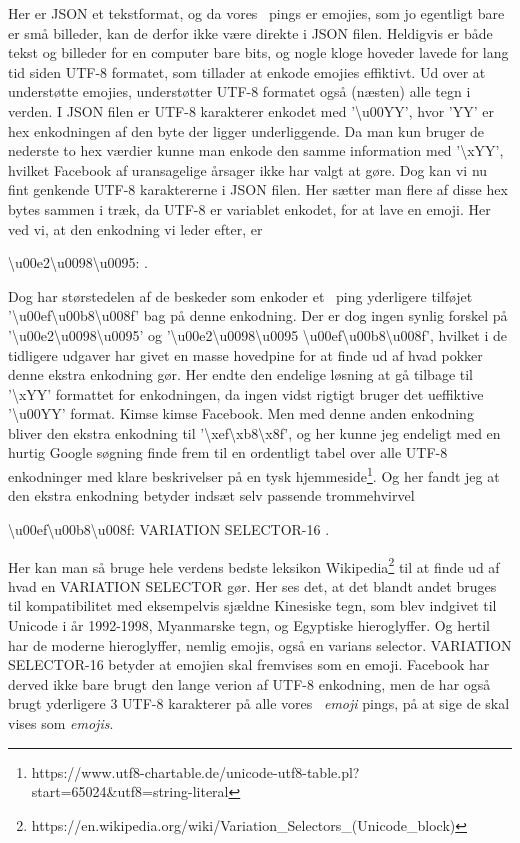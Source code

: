 \begin{article}
Her er JSON et tekstformat, og da vores \coffee\ pings er emojies, som jo egentligt bare er små billeder, kan de derfor ikke være direkte i JSON filen. Heldigvis er både tekst og billeder for en computer bare bits, og nogle kloge hoveder lavede for lang tid siden UTF-8 formatet, som tillader at enkode emojies effiktivt.
Ud over at understøtte emojies, understøtter UTF-8 formatet også (næsten) alle tegn i verden. I JSON filen er UTF-8 karakterer enkodet med '\textbackslash u00YY', hvor 'YY' er hex enkodningen af den byte der ligger underliggende. Da man kun bruger de nederste to hex værdier kunne man enkode den samme information med '\textbackslash xYY', hvilket Facebook af uransagelige årsager ikke har valgt at gøre.
Dog kan vi nu fint genkende UTF-8 karaktererne i JSON filen. Her sætter man flere af disse hex bytes sammen i træk, da UTF-8 er variablet enkodet, for at lave en emoji. Her ved vi, at den enkodning vi leder efter, er
\begin{center}
	\textbackslash u00e2\textbackslash u0098\textbackslash u0095: \coffee \; .
\end{center}
Dog har størstedelen af de beskeder som enkoder et \coffee\ ping yderligere tilføjet '\textbackslash u00ef\textbackslash u00b8\textbackslash u008f' bag på denne enkodning.
Der er dog ingen synlig forskel på '\textbackslash u00e2\textbackslash u0098\textbackslash u0095' og '\textbackslash u00e2\textbackslash u0098\textbackslash u0095 \textbackslash u00ef\textbackslash u00b8\textbackslash u008f', hvilket i de tidligere udgaver har givet en masse hovedpine for at finde ud af hvad pokker denne ekstra enkodning gør.
Her endte den endelige løsning at gå tilbage til '\textbackslash xYY' formattet for enkodningen, da ingen vidst rigtigt bruger det ueffiktive '\textbackslash u00YY' format. Kimse kimse Facebook.
Men med denne anden enkodning bliver den ekstra enkodning til '\textbackslash xef\textbackslash xb8\textbackslash x8f', og her kunne jeg endeligt med en hurtig Google søgning finde frem til en ordentligt tabel over alle UTF-8 enkodninger med klare beskrivelser på en tysk hjemmeside\footnote{https://www.utf8-chartable.de/unicode-utf8-table.pl?start=65024\&utf8=string-literal}.
Og her fandt jeg at den ekstra enkodning betyder \textasteriskcentered\! indsæt selv passende trommehvirvel\! \textasteriskcentered\
\begin{center}
	\textbackslash u00ef\textbackslash u00b8\textbackslash u008f: VARIATION SELECTOR-16 \; .
\end{center}
Her kan man så bruge hele verdens bedste leksikon Wikipedia\footnote{https://en.wikipedia.org/wiki/Variation\_Selectors\_(Unicode\_block)} til at finde ud af hvad en VARIATION SELECTOR gør.
Her ses det, at det blandt andet bruges til kompatibilitet med eksempelvis sjældne Kinesiske tegn, som blev indgivet til Unicode i år 1992-1998, Myanmarske tegn, og Egyptiske hieroglyffer. Og hertil har de moderne hieroglyffer, nemlig emojis, også en varians selector. VARIATION SELECTOR-16 betyder at emojien skal fremvises som en emoji.
Facebook har derved ikke bare brugt den lange verion af UTF-8 enkodning, men de har også brugt yderligere 3 UTF-8 karakterer på alle vores \coffee\ \emph{emoji} pings, på at sige de skal vises som \emph{emojis}.


\end{article}
